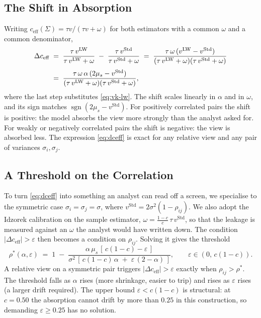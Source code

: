 \documentclass[a4paper,11pt]{article}
\theoremstyle{plain}
\theoremstyle{definition}
\newcommand{\Std}{\mathrm{Std}}
\newcommand{\LW}{\mathrm{LW}}
\newcommand{\eff}{\mathrm{eff}}
\begin{document}
\subsection{The Shift in Absorption}
\label{sec:shift}

Writing $c_{\eff}(\Sigma) = \tau v / (\tau v + \omega)$ for both estimators with a
common $\omega$ and a common denominator,
\begin{align}
  \Delta c_{\eff}
  \;&=\; \frac{\tau\,v^\LW}{\tau\,v^\LW + \omega}
        \;-\; \frac{\tau\,v^\Std}{\tau\,v^\Std + \omega}
  \;=\; \frac{\tau\,\omega\,(v^\LW - v^\Std)}
              {(\tau\,v^\LW + \omega)(\tau\,v^\Std + \omega)} \notag\\[0.3em]
  \;&=\; \frac{\tau\,\omega\,\alpha\,(2\mu_s - v^\Std)}
              {(\tau\,v^\LW + \omega)(\tau\,v^\Std + \omega)} ,
\label{eq:dceff}
\end{align}
where the last step substitutes \eqref{eq:vk-lw}. The shift scales linearly in
$\alpha$ and in $\omega$, and its sign matches $\operatorname{sgn}(2\mu_s - v^\Std)$.
For positively correlated pairs the shift is positive: the model absorbs the view
more strongly than the analyst asked for. For weakly or negatively correlated
pairs the shift is negative: the view is absorbed less. The expression
\eqref{eq:dceff} is exact for any relative view and any pair of variances
$\sigma_i, \sigma_j$.

\subsection{A Threshold on the Correlation}
\label{sec:rho-star}

To turn \eqref{eq:dceff} into something an analyst can read off a screen, we
specialise to the symmetric case $\sigma_i = \sigma_j = \sigma$, where
$v^\Std = 2\sigma^2(1 - \rho_{ij})$. We also adopt the Idzorek calibration on the
sample estimator, $\omega = \tfrac{1-c}{c}\,\tau\,v^\Std$, so that the leakage is
measured against an $\omega$ the analyst would have written down. The condition
$|\Delta c_{\eff}| > \varepsilon$ then becomes a condition on $\rho_{ij}$. Solving
it gives the threshold
\begin{equation}
\label{eq:rho-star}
  \rho^*(\alpha, \varepsilon)
  \;=\;
  1 \;-\; \frac{\alpha\,\mu_s\,[\,c(1-c) - \varepsilon\,]}
              {\sigma^2\,[\,c(1-c)\,\alpha \;+\; \varepsilon\,(2 - \alpha)\,]},
  \qquad \varepsilon \in (0,\,c(1-c)) .
\end{equation}
A relative view on a symmetric pair triggers $|\Delta c_{\eff}| > \varepsilon$
exactly when $\rho_{ij} > \rho^*$. The threshold falls as $\alpha$ rises (more
shrinkage, easier to trip) and rises as $\varepsilon$ rises (a larger drift
required). The upper bound $\varepsilon < c(1-c)$ is structural: at $c = 0.50$ the
absorption cannot drift by more than $0.25$ in this construction, so demanding
$\varepsilon \geq 0.25$ has no solution.
\end{document}
